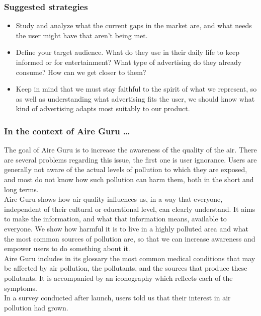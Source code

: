 \subsubsection*{Suggested strategies}

\begin{itemize}
    \item Study and analyze what the current gaps in the market are, and what needs the user might have that aren't being met.
    \item Define your target audience. What do they use in their daily life to keep informed or for entertainment?
    What type of advertising do they already consume? How can we get closer to them?
    \item Keep in mind that we must stay faithful to the spirit of what we represent, so as well as understanding what advertising fits the user,
    we should know what kind of advertising adapts most suitably to our product.
\end{itemize}

\subsubsection*{In the context of Aire Guru \ldots}

The goal of Aire Guru is to increase the awareness of the quality of the air.
There are several problems regarding this issue, the first one is user ignorance.
Users are generally not aware of the actual levels of pollution to which they are exposed, and most do not know how such pollution can harm them,
both in the short and long terms.\\

Aire Guru shows how air quality influences us, in a way that everyone, independent of their cultural or educational level, can clearly understand.
It aims to make the information, and what that information means, available to everyone.
We show how harmful it is to live in a highly polluted area and what the most common sources of pollution
are, so that we can increase awareness and empower users to do something about it.\\

Aire Guru includes in its glossary the most common medical conditions that may be affected by air pollution, the pollutants, and the sources that produce these pollutants.
It is accompanied by an iconography which reflects each of the symptoms. \\

In a survey conducted after launch, users told us that their interest in air pollution had grown.\\

